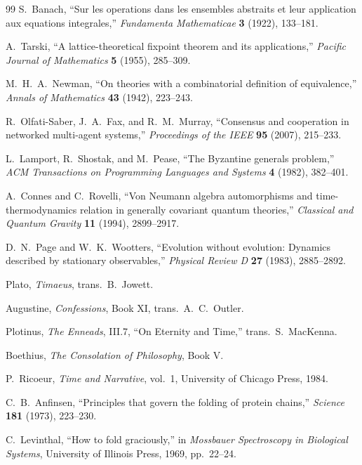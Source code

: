 \documentclass[11pt]{article}
\theoremstyle{remark}
\theoremstyle{plain}
\begin{document}
\begin{thebibliography}{99}
S.\ Banach,
``Sur les operations dans les ensembles abstraits et leur application aux equations integrales,''
\emph{Fundamenta Mathematicae} \textbf{3} (1922), 133--181.

A.\ Tarski,
``A lattice-theoretical fixpoint theorem and its applications,''
\emph{Pacific Journal of Mathematics} \textbf{5} (1955), 285--309.

M.\ H.\ A.\ Newman,
``On theories with a combinatorial definition of equivalence,''
\emph{Annals of Mathematics} \textbf{43} (1942), 223--243.

R.\ Olfati-Saber, J.\ A.\ Fax, and R.\ M.\ Murray,
``Consensus and cooperation in networked multi-agent systems,''
\emph{Proceedings of the IEEE} \textbf{95} (2007), 215--233.

L.\ Lamport, R.\ Shostak, and M.\ Pease,
``The Byzantine generals problem,''
\emph{ACM Transactions on Programming Languages and Systems} \textbf{4} (1982), 382--401.

A.\ Connes and C.\ Rovelli,
``Von Neumann algebra automorphisms and time-thermodynamics relation in generally covariant quantum theories,''
\emph{Classical and Quantum Gravity} \textbf{11} (1994), 2899--2917.

D.\ N.\ Page and W.\ K.\ Wootters,
``Evolution without evolution: Dynamics described by stationary observables,''
\emph{Physical Review D} \textbf{27} (1983), 2885--2892.

Plato,
\emph{Timaeus},
trans.\ B.\ Jowett.

Augustine,
\emph{Confessions}, Book XI,
trans.\ A.\ C.\ Outler.

Plotinus,
\emph{The Enneads}, III.7, ``On Eternity and Time,''
trans.\ S.\ MacKenna.

Boethius,
\emph{The Consolation of Philosophy}, Book V.

P.\ Ricoeur,
\emph{Time and Narrative}, vol.\ 1,
University of Chicago Press, 1984.

C.\ B.\ Anfinsen,
``Principles that govern the folding of protein chains,''
\emph{Science} \textbf{181} (1973), 223--230.

C.\ Levinthal,
``How to fold graciously,''
in \emph{Mossbauer Spectroscopy in Biological Systems},
University of Illinois Press, 1969, pp.\ 22--24.


\end{thebibliography}
\end{document}
